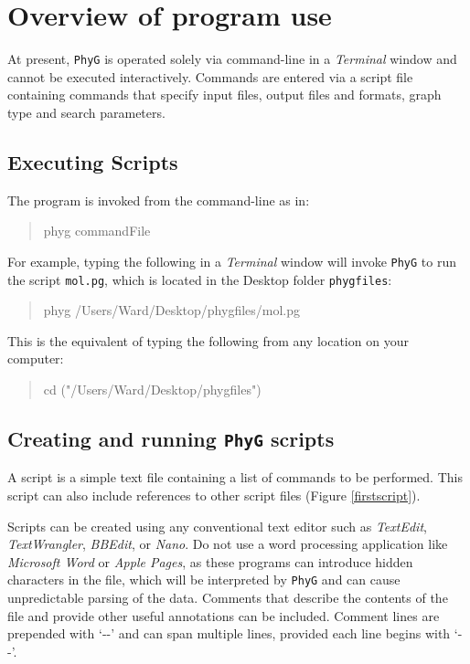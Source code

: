 \documentclass[11pt]{book}
\newcommand{\phyg}{\texttt{PhyG} }
\begin{document}
{{%
\section{Overview of program use}
	At present, \phyg is operated solely via command-line in a \textit{Terminal} window
	and cannot be executed interactively. Commands are entered via a script file 
	containing commands that specify input files, output files and formats, graph type 
	and search parameters.
		
	\subsection{Executing Scripts}
		The program is invoked from the command-line as in:
		
		\begin{quote}
		phyg commandFile
		\end{quote}
		
		\smallskip
		
		\noindent For example, typing the following in a \textit{Terminal} window will invoke 
		\phyg to run the script \texttt{mol.pg}, which is located in the Desktop folder 
		\texttt{phygfiles}:
		
		\begin{quote}
  		phyg /Users/Ward/Desktop/phygfiles/mol.pg
		\end{quote}
		
		\bigskip
		
		\noindent 
		This is the equivalent of typing the following from any location on your computer:
		
		\begin{quote}
   		cd ("/Users/Ward/Desktop/phygfiles")
		\end{quote}
			
		\subsection{Creating and running \phyg scripts}
		A script is a simple text file containing a list of commands to be performed. 
		This script can also include references to other script files 
		(Figure \ref{firstscript}).
		
		Scripts can be created using any conventional text editor such as \textit{TextEdit}, 
		\textit{TextWrangler}, \textit{BBEdit}, or \textit{Nano}. Do not use a word processing 
		application like \textit{Microsoft Word} or \textit{Apple Pages}, as these programs 
		can introduce hidden characters in the file, which will be interpreted by \phyg and 
		can cause unpredictable parsing of the data. Comments that describe the contents 
		of the file and provide other useful annotations can be included. Comment lines are 
		prepended with `-{}-' and can span multiple lines, provided each line begins with `-{}-'. 

}}
\end{document}
